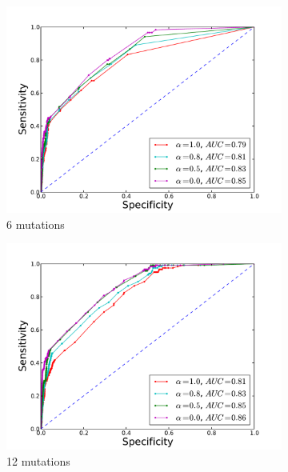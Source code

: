 \begin{figure}
\begin{subfigure}[b]{0.3\textwidth}
\includegraphics[width=1.2\textwidth]{figures/ROC_6.pdf}
\caption{6 mutations}
\label{fig:ROC6mut}
\end{subfigure}
\hfill
\begin{subfigure}[b]{0.3\textwidth}
\includegraphics[width=1.2\textwidth]{figures/ROC_12.pdf}
\caption{12 mutations}
\label{fig:ROC12mut}
\end{subfigure}
\hfill
\begin{subfigure}[b]{0.3\textwidth}

\end{subfigure}
\end{figure}
